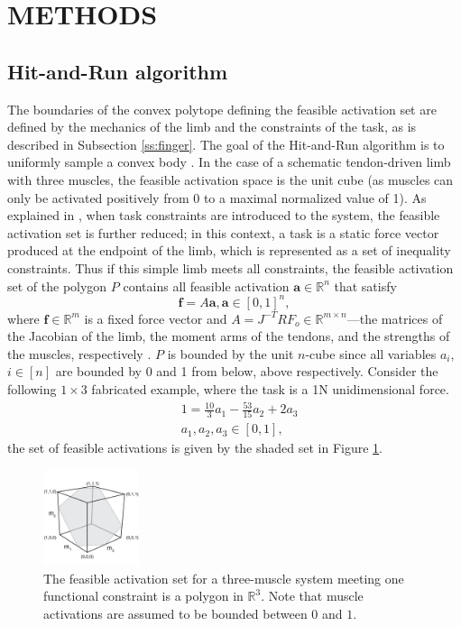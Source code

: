 \section{METHODS}

\subsection{Hit-and-Run algorithm}
The boundaries of the convex polytope defining the feasible activation set are defined by the mechanics of the limb and the constraints of the task, as is described in Subsection \ref{ss:finger}. The goal of the Hit-and-Run algorithm is to uniformly sample a convex body \cite{smith1984efficient}. 
In the case of a schematic tendon-driven limb with three muscles, the feasible activation space is the unit cube (as muscles can only be activated positively from 0 to a maximal normalized value of 1). As explained in \cite{Valero-Cuevas2009mathematical}, when task constraints are introduced to the system, the feasible activation set is further reduced; in this context, a task is a static force vector produced at the endpoint of the limb, which is represented as a set of inequality constraints. Thus if this simple limb meets all constraints, the feasible activation set of the polygon $P$ contains all feasible activation  $\textbf{a} \in \mathbb{R}^n$ that satisfy
\[\textbf{f} = A\textbf{a}, \textbf{a} \in [0,1]^n,\]
where $\textbf{f} \in \mathbb{R}^m$ is a fixed force vector and $A = J^{-T}RF_o \in \mathbb{R}^{m \times n}$---the matrices of the Jacobian of the limb, the moment arms of the tendons, and the strengths of the muscles, respectively \cite{Valero-Cuevas1998Large,Valero-Cuevas2009mathematical}. $P$ is bounded by the unit $n$-cube since all variables $a_i$, $i \in [n]$ are bounded by 0 and 1 from below, above respectively.
Consider the following $1 \times 3$ fabricated example, where the task is a 1N unidimensional force.
\begin{align*}
&1 = \frac{10}{3}a_1 - \frac{53}{15}a_2 + 2a_3 \\
&a_1, a_2, a_3 \in [0,1],
\end{align*}
the set of feasible activations is given by the shaded set in Figure \ref{fig:fig_hr}.

\begin{figure}[ht]
  \label{fig:fig_hr}
   \begin{center}
    \includegraphics[width=0.25\textwidth]{sections/figs/feasibleactivation.png}
  \end{center}
  \caption{The feasible activation set for a  three-muscle system meeting one functional constraint is a polygon in $\mathbb{R}^3$. Note that muscle activations are assumed to be bounded between $0$ and $1$.}

\end{figure}

